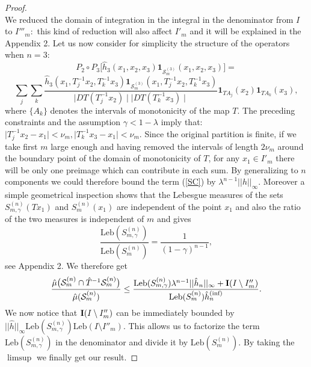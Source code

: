 \documentclass[12pt,reqno,a4paper]{amsart}
\def\Le{\text{Leb}}
\begin{document}
\begin{proof}
$$$$
We reduced the domain of integration in the integral in the denominator from $I$ to $I'''_m:$ this kind of reduction will also affect $I'_m$ and it will be explained in the Appendix 2.
 Let us now consider for simplicity the structure of the operators when $n=3$:
	 	 $$P_{2}\circ P_{3}\big[\hat{h}_3(x_{1}, x_{2}, x_{3})\textbf{1}_{\mathcal{S}^{(3)}_{m}}(x_1,x_2,x_3)\big]=$$
\begin{equation}\label{SC}
\sum\limits_{j}\sum\limits_{k}\frac{\hat{h}_3(x_{1},T^{-1}_{j}x_{2}, T^{-1}_{k}x_{3})
         \textbf{1}_{\mathcal{S}^{(3)}_{m}}(x_{1},T^{-1}_{j}x_{2}, T^{-1}_{k}x_{3})}{\mid DT(T^{-1}_{j}x_2)\mid \mid DT(T^{-1}_{k}x_3)\mid}\textbf{1}_{TA_j}(x_2)\textbf{1}_{TA_k}(x_3),
         \end{equation}
	 	 where $\{A_k\}$ denotes the intervals of monotonicity of the map $T$.   The preceding  constraints and the assumption $\gamma<1-\lambda$ imply that:
	 	 $
	 	 \mid T_{j}^{-1}x_{2}-x_1 \mid <\nu_m,
	 	 	\mid T_{k}^{-1}x_{3} -x_1 \mid < \nu_m$.
Since
	 	  the original partition is finite, if we take first $m$ large enough and having removed the intervals of length $2\nu_m$ around the boundary point of the domain of monotonicity of $T$,  for any $x_1\in I'_m$ there will be only one preimage which can contribute in each sum.  By generalizing to $n$ components we could therefore bound the term (\ref{SC}) by $\lambda^{n-1}||h||_{\infty}$. Moreover a simple geometrical inspection shows that the Lebesgue measures of the sets $S^{(n)}_{m,\gamma}(Tx_1)$ and $S^{(n)}_{m}(x_1)$ are independent of the point $x_1$ and also the ratio of the two measures is independent of $m$ and  gives
 \begin{equation}\label{CAR}
 \frac{\Le (S^{(n)}_{m,\gamma})}{\Le(S^{(n)}_{m})}=\frac{1}{(1-\gamma)^{n-1}},
  \end{equation}
  see Appendix 2.
We therefore get
 \begin{equation}\label{ing of remp}
	 	\frac{\hat{\mu}\big(\mathcal{S}^{(n)}_{m}\cap\hat{T}^{-1}\mathcal{S}^{(n)}_{m}\big)}{\hat{\mu}(\mathcal{S}^{(n)}_{m})}\leq \frac{\Le (S^{(n)}_{m,\gamma})\lambda^{n-1}||\hat{h}_n||_{\infty}+{\bf I}(I\setminus I''_m)}{\Le(S^{(n)}_{m})\hat{h}_n^{(\text{inf})}}.
	 	 \end{equation}
We now notice that ${\bf I}(I\setminus I''_m)$ can be immediately bounded by $||\hat{h}||_{\infty}\Le (S^{(n)}_{m,\gamma}) \Le(I\setminus I''_m)$. This allows us to factorize the term $\Le (S^{(n)}_{m,\gamma})$ in the denominator and divide it by $\Le(S^{(n)}_{m}).$ By taking the $\limsup$ we finally get our result.
\end{proof}
\end{document}
